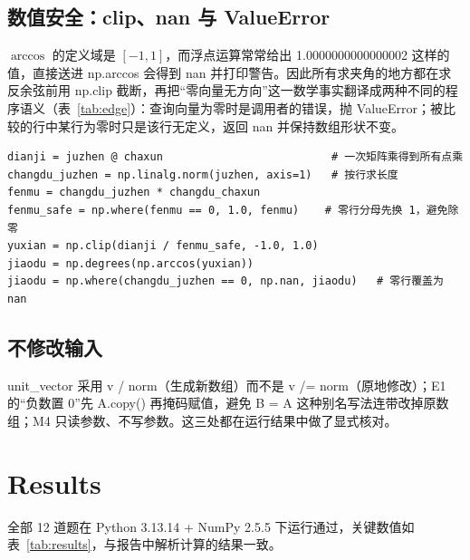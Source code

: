 \documentclass[a4paper,12pt]{article}
\newcommand{\code}[1]{{\ttfamily\footnotesize #1}}
\begin{document}
\subsection{数值安全：clip、nan 与 ValueError}

$\arccos$ 的定义域是 $[-1,1]$，而浮点运算常常给出 \code{1.0000000000000002} 这样的值，直接送进 \code{np.arccos} 会得到 \code{nan} 并打印警告。因此所有求夹角的地方都在求反余弦前用 \code{np.clip} 截断，再把“零向量无方向”这一数学事实翻译成两种不同的程序语义（表~\ref{tab:edge}）：查询向量为零时是调用者的错误，抛 \code{ValueError}；被比较的行中某行为零时只是该行无定义，返回 \code{nan} 并保持数组形状不变。

\begin{lstlisting}[caption={NP-M1：批量夹角中的 clip 与 nan 处理（原样片段）}, label={lst:m1}]
dianji = juzhen @ chaxun                          # 一次矩阵乘得到所有点乘
changdu_juzhen = np.linalg.norm(juzhen, axis=1)   # 按行求长度
fenmu = changdu_juzhen * changdu_chaxun
fenmu_safe = np.where(fenmu == 0, 1.0, fenmu)    # 零行分母先换 1，避免除零
yuxian = np.clip(dianji / fenmu_safe, -1.0, 1.0)
jiaodu = np.degrees(np.arccos(yuxian))
jiaodu = np.where(changdu_juzhen == 0, np.nan, jiaodu)   # 零行覆盖为 nan
\end{lstlisting}

\subsection{不修改输入}

\code{unit\_vector} 采用 \code{v / norm}（生成新数组）而不是 \code{v /= norm}（原地修改）；E1 的“负数置 0”先 \code{A.copy()} 再掩码赋值，避免 \code{B = A} 这种别名写法连带改掉原数组；M4 只读参数、不写参数。这三处都在运行结果中做了显式核对。

\section{Results}

全部 12 道题在 Python 3.13.14 + NumPy 2.5.5 下运行通过，关键数值如表~\ref{tab:results}，与报告中解析计算的结果一致。
\end{document}
